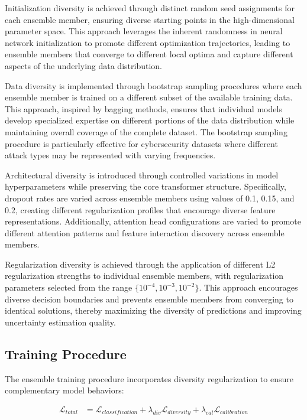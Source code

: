 \documentclass[journal]{IEEEtran}
\begin{document}
Initialization diversity is achieved through distinct random seed assignments for each ensemble member, ensuring diverse starting points in the high-dimensional parameter space. This approach leverages the inherent randomness in neural network initialization to promote different optimization trajectories, leading to ensemble members that converge to different local optima and capture different aspects of the underlying data distribution.

Data diversity is implemented through bootstrap sampling procedures where each ensemble member is trained on a different subset of the available training data. This approach, inspired by bagging methods, ensures that individual models develop specialized expertise on different portions of the data distribution while maintaining overall coverage of the complete dataset. The bootstrap sampling procedure is particularly effective for cybersecurity datasets where different attack types may be represented with varying frequencies.

Architectural diversity is introduced through controlled variations in model hyperparameters while preserving the core transformer structure. Specifically, dropout rates are varied across ensemble members using values of 0.1, 0.15, and 0.2, creating different regularization profiles that encourage diverse feature representations. Additionally, attention head configurations are varied to promote different attention patterns and feature interaction discovery across ensemble members.

Regularization diversity is achieved through the application of different L2 regularization strengths to individual ensemble members, with regularization parameters selected from the range $\{10^{-4}, 10^{-3}, 10^{-2}\}$. This approach encourages diverse decision boundaries and prevents ensemble members from converging to identical solutions, thereby maximizing the diversity of predictions and improving uncertainty estimation quality.

\subsection{Training Procedure}

The ensemble training procedure incorporates diversity regularization to ensure complementary model behaviors:

\begin{align}
\mathcal{L}_{total} &= \mathcal{L}_{classification} + \lambda_{div} \mathcal{L}_{diversity} + \lambda_{cal} \mathcal{L}_{calibration}
\end{align}
\end{document}
